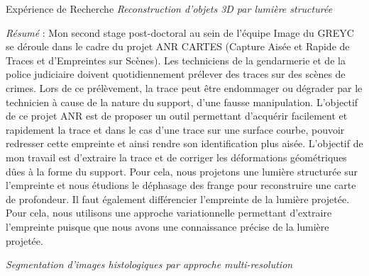 \begin{rubric}{Expérience de Recherche}
   \entry*[2010-2011]
  \textit{Reconstruction d'objets 3D par lumière structurée}\newline

  \textit{Résumé} : Mon second stage post-doctoral au sein de l'équipe
  Image du GREYC se déroule dans le cadre du projet ANR CARTES
  (Capture Aisée et Rapide de Traces et d'Empreintes sur Scènes). Les
  techniciens de la gendarmerie et de la police judiciaire doivent
  quotidiennement prélever des traces sur des scènes de crimes. Lors de
  ce prélèvement, la trace peut être endommager ou dégrader par le
  technicien à cause de la nature du support, d'une fausse
  manipulation. L'objectif de ce projet ANR est de proposer un outil
  permettant d'acquérir facilement et rapidement la trace et dans le
  cas d'une trace sur une surface courbe, pouvoir redresser cette
  empreinte et ainsi rendre son identification plus aisée. L'objectif
  de mon travail est d'extraire la trace et de corriger les
  déformations géométriques dûes à la forme du support. Pour cela,
  nous projetons une lumière structurée sur l'empreinte et nous
  étudions le déphasage des frange pour reconstruire une carte de
  profondeur. Il faut également différencier l'empreinte de la lumière
  projetée. Pour cela, nous utilisons une approche variationnelle permettant
  d'extraire l'empreinte puisque que nous avons une connaissance
  précise de la lumière projetée.

  \entry*[2009-2010]
  \textit{Segmentation d'images histologiques par approche multi-resolution}\newline


\end{rubric}
